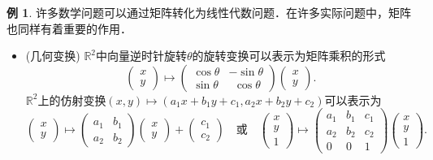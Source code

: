 \documentclass[a4paper,fontset=windows]{ctexbook}
\theoremstyle{definition}
\newtheorem{example}{例}[chapter]
\begin{document}
\begin{example}\label{ex2.6}
许多数学问题可以通过矩阵转化为线性代数问题．在许多实际问题中，矩阵也同样有着重要的作用．
\begin{itemize}
\item{\rm(几何变换)} $\mathbb{R}^2$中向量逆时针旋转$\theta$的旋转变换可以表示为矩阵乘积的形式
$$\begin{pmatrix}x \\ y\end{pmatrix}\mapsto\begin{pmatrix}\cos\theta&-\sin\theta \\ \sin\theta&~~\cos\theta\end{pmatrix}\begin{pmatrix}x \\ y\end{pmatrix}.$$
$\mathbb{R}^2$上的仿射变换$(x,y)\mapsto(a_1x+b_1y+c_1,a_2x+b_2y+c_2)$可以表示为
$$\begin{pmatrix}x \\ y\end{pmatrix}\mapsto\begin{pmatrix}a_1&b_1 \\ a_2&b_2\end{pmatrix}\begin{pmatrix}x \\ y\end{pmatrix}+\begin{pmatrix}c_1 \\ c_2\end{pmatrix}\quad\text{或}\quad\begin{pmatrix}x \\ y \\ 1\end{pmatrix}\mapsto\begin{pmatrix}a_1&b_1&c_1 \\ a_2&b_2&c_2 \\ 0&0&1\end{pmatrix}\begin{pmatrix}x \\ y \\ 1\end{pmatrix}.$$


\end{itemize}
\end{example}
\end{document}
